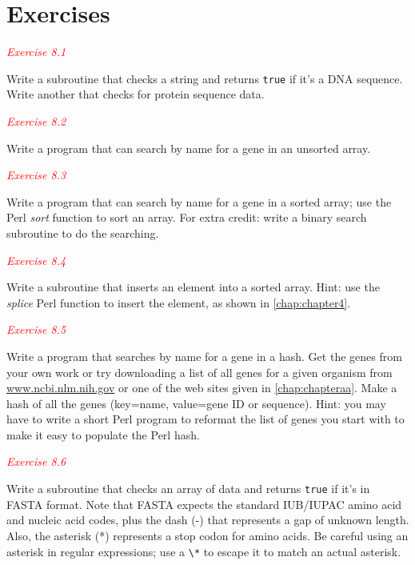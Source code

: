 \section{Exercises}
\textcolor{red}{\textit{Exercise 8.1}}
\begin{adjustwidth}{2em}{}
Write a subroutine that checks a string and returns \verb|true| if it's a DNA sequence. Write another that checks for protein sequence data. 
\end{adjustwidth}

\textcolor{red}{\textit{Exercise 8.2}}
\begin{adjustwidth}{2em}{}
Write a program that can search by name for a gene in an unsorted array.
\end{adjustwidth}

\textcolor{red}{\textit{Exercise 8.3}}
\begin{adjustwidth}{2em}{}
Write a program that can search by name for a gene in a sorted array; use the Perl \textit{sort} function to sort an array. For extra credit: write a binary search subroutine to do the searching. 
\end{adjustwidth}

\textcolor{red}{\textit{Exercise 8.4}}
\begin{adjustwidth}{2em}{}
Write a subroutine that inserts an element into a sorted array. Hint: use the \textit{splice} Perl function to insert the element, as shown in \autoref{chap:chapter4}. 
\end{adjustwidth}

\textcolor{red}{\textit{Exercise 8.5}}
\begin{adjustwidth}{2em}{}
Write a program that searches by name for a gene in a hash. Get the genes from your own work or try downloading a list of all genes for a given organism from \href{www.ncbi.nlm.nih.gov}{www.ncbi.nlm.nih.gov} or one of the web sites given in \autoref{chap:chapteraa}. Make a hash of all the genes (key=name, value=gene ID or sequence). Hint: you may have to write a short Perl program to reformat the list of genes you start with to make it easy to populate the Perl hash. 
\end{adjustwidth}

\textcolor{red}{\textit{Exercise 8.6}}
\begin{adjustwidth}{2em}{}
Write a subroutine that checks an array of data and returns \verb|true| if it's in FASTA format. Note that FASTA expects the standard IUB/IUPAC amino acid and nucleic acid codes, plus the dash (-) that represents a gap of unknown length. Also, the asterisk (*) represents a stop codon for amino acids. Be careful using an asterisk in regular expressions; use a \verb|\*| to escape it to match an actual asterisk. 
\end{adjustwidth}


